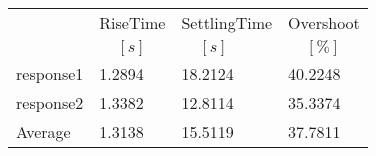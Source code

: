 \begin{tabular}{llll}
  & RiseTime & SettlingTime & Overshoot  \\ 
  & $\;\;\;\;[s]$ & $\;\;\;\;[s]$ & $\;\;\;\;[\%]$  \\ 
\hline 
response1 & 1.2894 & 18.2124 & 40.2248  \\ 
response2 & 1.3382 & 12.8114 & 35.3374 \\ 
Average & 1.3138 & 15.5119 & 37.7811  \\ 
\hline 
\end{tabular}


